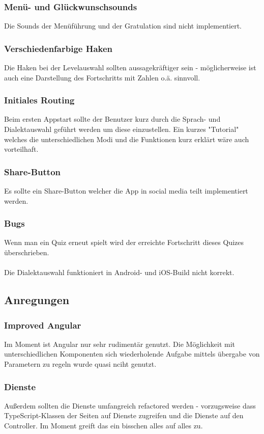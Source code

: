 \subsubsection*{Menü- und Glückwunschsounds}
Die Sounds der Menüführung und der Gratulation sind nicht implementiert.

\subsubsection*{Verschiedenfarbige Haken}
Die Haken bei der Levelauswahl sollten aussagekräftiger sein - möglicherweise ist auch eine Darstellung des Fortschritts mit Zahlen o.ä. sinnvoll.

\subsubsection*{Initiales Routing}
Beim ersten Appstart sollte der Benutzer kurz durch die Sprach- und Dialektauswahl geführt werden um diese einzustellen. Ein kurzes "Tutorial" welches die unterschiedlichen Modi und die Funktionen kurz erklärt wäre auch vorteilhaft.

\subsubsection*{Share-Button}
Es sollte ein Share-Button welcher die App in social media teilt implementiert werden.

\subsubsection*{Bugs}
Wenn man ein Quiz erneut spielt wird der erreichte Fortschritt dieses Quizes überschrieben.\\\\
Die Dialektauswahl funktioniert in Android- und iOS-Build nicht korrekt.

\subsection{Anregungen}
\subsubsection*{Improved Angular}
Im Moment ist Angular nur sehr rudimentär genutzt. Die Möglichkeit mit unterschiedlichen Komponenten sich wiederholende Aufgabe mittels übergabe von Parametern zu regeln wurde quasi nciht genutzt. 

\subsubsection*{Dienste}
Außerdem sollten die Dienste umfangreich refactored werden - vorzugsweise dass TypeScript-Klassen der Seiten auf Dienste zugreifen und die Dienste auf den Controller. Im Moment greift das ein bisschen alles auf alles zu.

